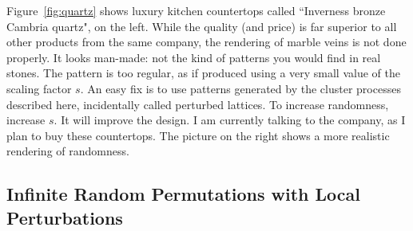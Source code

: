 \documentclass[10pt]{article}
\begin{document}
\noindent Figure~\ref{fig:quartz} shows luxury kitchen countertops called ``Inverness bronze Cambria quartz", on the left. While the quality (and price) is far superior to all
other products from the same company, the rendering of marble veins is not done properly. It looks man-made: not the kind of patterns you would
find in real stones. The pattern is too regular, as if produced using a very small value of the scaling factor $s$. An easy fix is to use patterns generated by the cluster processes described here, incidentally called perturbed lattices. To increase randomness, increase $s$. It will improve the design. I am currently talking to the company, as I plan to buy these countertops. The picture on the right shows a more realistic rendering of randomness.


\subsection{Infinite Random Permutations with Local Perturbations}\label{permut}
\end{document}
